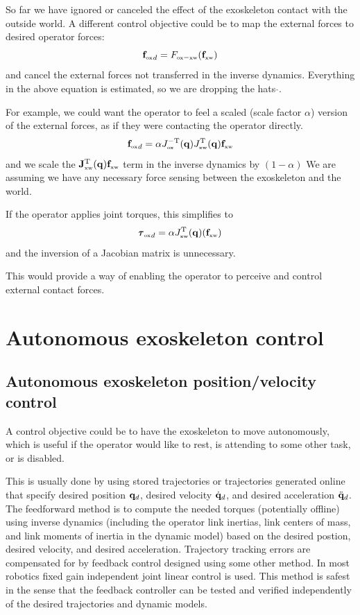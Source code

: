 \documentclass[letterpaper,12pt,fullpage]{article}
\newcommand{\ox}{{\mbox {\tiny ox}}}
\newcommand{\xw}{{\mbox {\tiny xw}}}
\begin{document}
So far we have ignored or canceled the effect of 
the exoskeleton contact with the outside world.
A different control objective could be to map the external forces to 
desired operator forces:
\begin{equation}
{\vf_{\ox}}_d = F_{\ox-\xw} ( \vf_{\xw} )
\end{equation}
and cancel the external forces not transferred in the inverse dynamics.
Everything in the above equation is estimated, so we are dropping the hats 
$\hat{\mbox{}}$.

For example, we could want the operator to feel a scaled (scale factor $\alpha$) 
version of the external
forces, as if they were contacting the operator directly.
\begin{equation}
{\vf_{\ox}}_d = \alpha J_{\ox}^{-\tr}(\vq) J_{\xw}^{\tr}(\vq) \vf_{\xw}
\end{equation}
and we scale the $\mJ_{\xw}^{\tr}(\vq) \vf_{\xw}$ term in the inverse dynamics
by $(1-\alpha)$
We are assuming we have any necessary force sensing between the exoskeleton and
the world.

If the operator applies joint torques, this simplifies to
\begin{equation}
{\vtau_{\ox}}_d = \alpha J_{\xw}^{\tr}(\vq) ( \vf_{\xw} )
\end{equation}
and the inversion of a Jacobian matrix is unnecessary.

This would provide a way of enabling the operator to perceive and control
external contact forces.

\section{Autonomous exoskeleton control}

\subsection{Autonomous exoskeleton position/velocity control}

A control objective could be to have the exoskeleton to move autonomously,
which is useful if the operator would like to rest, is attending to some other
task, or is disabled.

This is usually done by using stored trajectories or trajectories generated
online that specify desired position ${\bf q}_d$, 
desired velocity $\dot{{\bf q}}_d$, and
desired acceleration $\ddot{{\bf q}}_d$.
The feedforward method is to compute the needed torques (potentially offline)
using inverse
dynamics (including the operator link inertias, link centers of mass, and link
moments of inertia in the dynamic model) based on the desired postion, 
desired velocity, and desired acceleration. Trajectory tracking errors are compensated
for by feedback control designed using some other method. In most robotics
fixed gain independent joint linear control is used.
This method is safest in the sense that the feedback controller can be tested
and verified independently of the desired trajectories and dynamic models.
\end{document}
